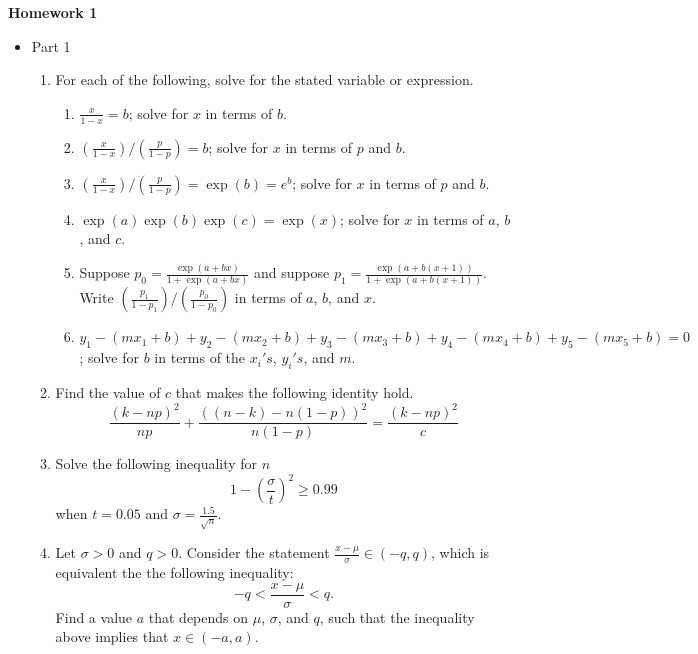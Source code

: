 \documentclass{article}
\begin{document}
\begin{center}
    \large \textbf{Homework 1}
\end{center}
        \begin{itemize}
            \item Part 1
                \begin{enumerate}
                    \item For each of the following, solve for the stated variable or expression.
                        \begin{enumerate}
                            \item $\displaystyle \frac{x}{1-x}=b$; solve for $x$ in terms of $b$.
                            \item $\displaystyle \left( \frac{x}{1-x}\right)\bigg/\left(\frac{p}{1-p}\right) = b$; solve for $x$ in terms of $p$ and $b$.
                            \item $\displaystyle \left(\frac{x}{1-x}\right) \bigg/ \left(\frac{p}{1-p}\right) = \exp(b) = e^b$; solve for $x$ in terms of $p$ and $b$.
                            \item $\displaystyle \exp(a)\exp(b)\exp(c)=\exp(x)$; solve for $x$ in terms of $a$, $b$, and $c$.
                            \item Suppose $\displaystyle p_0 = \frac{\exp(a+bx)}{1+\exp(a+bx)}$ and suppose $\displaystyle p_1=\frac{\exp(a+b(x+1))}{1+\exp(a+b(x+1))}$.  Write $\displaystyle \left(\frac{p_1}{1-p_1}\right) \bigg/ \left(\frac{p_0}{1-p_0}\right)$ in terms of $a$, $b$, and $x$.
                            \item $\displaystyle y_1-(mx_1+b)+y_2-(mx_2+b)+y_3-(mx_3+b)+y_4-(mx_4+b)+y_5-(mx_5+b)=0$; solve for $b$ in terms of the $x_i's$, $y_i's$, and $m$.
                        \end{enumerate}
                    \item Find the value of $c$ that makes the following identity hold. $$\frac{(k-np)^2}{np}+\frac{((n-k)-n(1-p))^2}{n(1-p)}=\frac{(k-np)^2}{c}$$
                    \item Solve the following inequality for $n$ $$1-\left(\frac{\sigma}{t}\right)^2 \geq 0.99$$ when $t=0.05$ and $\displaystyle \sigma = \frac{1.5}{\sqrt{n}}$.
                    \item Let $\sigma >0$ and $q >0$.  Consider the statement $\displaystyle \frac{x-\mu}{\sigma} \in (-q, q)$, which is equivalent the the following inequality: $$-q < \frac{x-\mu}{\sigma} <q.$$  Find a value $a$ that depends on $\mu$, $\sigma$, and $q$, such that the inequality above implies that $x\in(-a,a)$. 

\end{enumerate}
\end{itemize}
\end{document}
